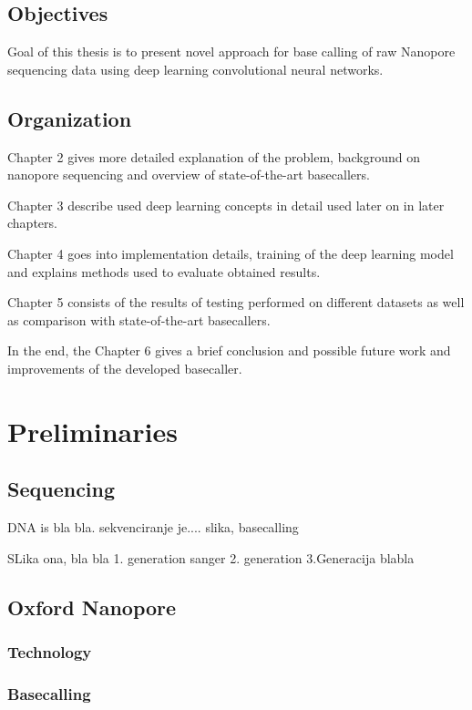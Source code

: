 \documentclass[times, utf8, diplomski, english]{fer}
\begin{document}
\section{Objectives}
Goal of this thesis is to present novel approach for base calling of raw Nanopore sequencing data using deep learning convolutional neural networks.
\section{Organization}
\indent Chapter 2 gives more detailed explanation of the problem, background on nanopore sequencing and overview of state-of-the-art basecallers.

Chapter 3 describe used deep learning concepts in detail used later on in later chapters.

Chapter 4 goes into implementation details, training of the deep learning model and explains methods used to evaluate obtained results. 

Chapter 5 consists of the results of testing performed on different datasets as well as comparison with state-of-the-art basecallers.

In the end, the Chapter 6 gives a brief conclusion and possible future work and improvements of the developed basecaller.

\chapter{Preliminaries}

\section{Sequencing}
DNA is bla bla. 
sekvenciranje je.... slika, basecalling


SLika ona, bla bla
1. generation sanger
2. generation
3.Generacija blabla


\section{Oxford Nanopore}

\subsection{Technology}

\subsection{Basecalling}
\end{document}
